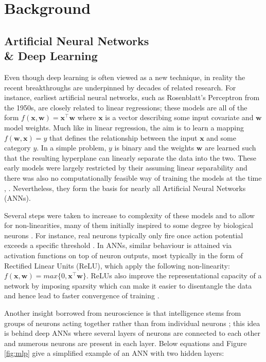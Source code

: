 \documentclass[12pt]{report}
\begin{document}
\newpage

\chapter{Background} \label{ch:backg}

\section{Artificial Neural Networks \\ \& Deep Learning}
Even though deep learning is often viewed as a new technique, in reality the recent breakthroughs are underpinned by decades of related research. For instance, earliest artificial neural networks, such as Rosenblatt's Perceptron \cite{Rosenblatt1958} from the 1950s, are closely related to linear regressions; these models are all of the form $f(\mathbf{x}, \mathbf{w})=\mathbf{x}^{\intercal} \mathbf{w}$ where $\mathbf{x}$ is a vector describing some input covariate and $\mathbf{w}$ model weights. Much like in linear regression, the aim is to learn a mapping $f(\mathbf{w}, \mathbf{x}) = y$ that defines the relationship between the input $\mathbf{x}$ and some category $y$. In a simple problem, $y$ is binary and the weights $\mathbf{w}$ are learned such that the resulting hyperplane can linearly separate the data into the two. These early models were largely restricted by their assuming linear separability and there was also no computationally feasible way of training the models at the time \cite{Goodfellow2016}, \cite{JurgenSchmidhuber2015}. Nevertheless, they form the basis for nearly all Artificial Neural Networks (ANNs). 

Several steps were taken to increase to complexity of these models and to allow for non-linearities, many of them initially inspired to some degree by biological neurons \cite{Goodfellow16}. For instance, real neurons typically only fire once action potential exceeds a specific threshold \cite{Hodgkin1990}. In ANNs, similar behaviour is attained via activation functions on top of neuron outputs, most typically in the form of Rectified Linear Units (ReLU), which apply the following non-linearity: $f(\mathbf{x}, \mathbf{w})=max\{0, \mathbf{x}^{\intercal} \mathbf{w}\}$. ReLUs also improve the representational capacity of a network by imposing sparsity which can make it easier to disentangle the data \cite{Glorot2011} and hence lead to faster convergence of training \cite{Krizhevsky2012}.

Another insight borrowed from neuroscience is that intelligence stems from groups of neurons acting together rather than from individual neurons \cite{Goodfellow2016}; this idea is behind deep ANNs where several layers of neurons are connected to each other and numerous neurons are present in each layer. Below equations and Figure \ref{fig:mlp} give a simplified example of an ANN with two hidden layers:
\end{document}
